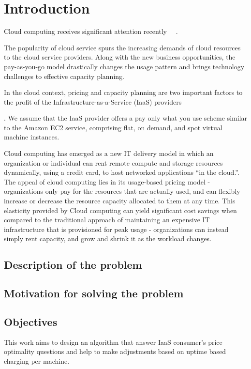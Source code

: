\documentclass[]{final_report}
\begin{document}
\chapter{Introduction}

Cloud computing receives significant attention recently ~\cite{5741288}~\cite{5704303}.

The popularity of cloud service spurs the increasing demands of cloud resources to the cloud service providers. Along with the new business opportunities, the pay-as-you-go model drastically changes the usage pattern and brings technology challenges to effective capacity planning.~\cite{6274129}


In the cloud context, pricing and capacity planning are two important factors to the profit of the Infrastructure-as-a-Service (IaaS) providers~\cite{6963393}

. We assume that the IaaS provider offers a pay only what you use scheme similar to the Amazon EC2 service, comprising flat, on demand, and spot virtual machine instances.


Cloud computing has emerged as a new IT delivery model in which an organization or individual can rent remote compute and storage resources dynamically, using a credit card, to host networked applications “in the cloud.”. The appeal of cloud computing lies in its usage-based pricing model - organizations only pay for the resources that are actually used, and can flexibly increase or decrease the resource capacity allocated to them at any time. This elasticity provided by Cloud computing can yield significant cost savings when compared to the traditional approach of maintaining an expensive IT infrastructure that is provisioned for peak usage - organizations can instead simply rent capacity, and grow and shrink it as the workload changes.~\cite{5961733}

\section{Description of the problem}

\section{Motivation for solving the problem}

\section{Objectives}
This work aims to design an algorithm that answer IaaS consumer's price optimality questions and help to make adjustments based on uptime based charging per machine. 
\end{document}
